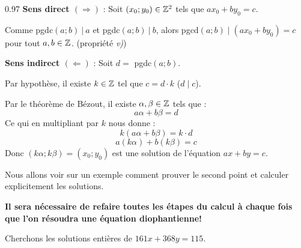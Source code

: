 \begin{demo}{0.97}
\textbf{Sens direct $(\Rightarrow)$} : Soit $(x_0;y_0)\in\mathbb{Z}^2$ tels que $ax_0+by_0=c$.

\medskip
Comme pgdc$(a;b)\ |\ a$ et pgdc$(a;b)\ |\ b$, alors pgcd$(a;b)\mid (ax_0+by_0)=c$ pour tout $a, b \in \mathbb{Z}$. (propriété \textit{v)})

\medskip
\textbf{Sens indirect $(\Leftarrow)$} : Soit $d=$ pgdc$(a;b)$.

\medskip
Par hypothèse, il existe $k\in \mathbb{Z}$ tel que $c=d\cdot k$ ($d\mid c$).

Par le théorème de Bézout, il existe $\alpha, \beta \in \mathbb{Z}$ tels que :
$$a\alpha +b\beta=d$$
Ce qui en multipliant par $k$ nous donne :
$$k(a\alpha +b\beta)=k\cdot d$$ 
$$a(k\alpha)+b(k\beta)=c$$
Donc $(k\alpha;k\beta)=(x_0;y_0)$ est une solution de l'équation $ax+by=c$.
\end{demo}


Nous allons voir sur un exemple comment prouver le second point et calculer explicitement les solutions.

\smallskip
\textbf{Il sera nécessaire de refaire toutes les étapes du calcul à chaque fois que l'on résoudra une équation diophantienne!} 

\bigskip
Cherchons les solutions entières de $161x+368y=115$.


